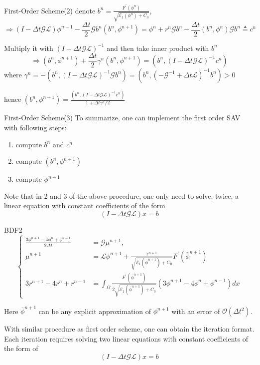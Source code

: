 \documentclass[9pt]{beamer}
\begin{document}
\begin{frame}{First-Order Scheme(2)}
denote $b^n = \frac{F^{\prime}(\phi^n)}{\sqrt{\mathcal{E}_{1}(\phi^{n})+C_0}}$,
$$\Rightarrow
(I-\Delta t \mathcal{G L}) \phi^{n+1}-\frac{\Delta t}{2} \mathcal{G}b^{n}\left(b^{n}, \phi^{n+1}\right)=\phi^{n}+r^{n} \mathcal{G} b^{n}-\frac{\Delta t}{2}\left(b^{n}, \phi^{n}\right) \mathcal{G} b^{n} \triangleq c^n$$

Multiply it with $(I-\Delta t \mathcal{G L})^{-1}$ and then take inner product with $b^n$
$$\Rightarrow
\left(b^{n}, \phi^{n+1}\right)+\frac{\Delta t}{2} \gamma^{n}\left(b^{n}, \phi^{n+1}\right)=\left(b^{n},(I-\Delta t \mathcal{G L})^{-1} c^{n}\right)$$
where $\gamma^{n}=-\left(b^{n},(I-\Delta t \mathcal{G} \mathcal{L})^{-1} \mathcal{G} b^{n}\right)=\left(b^{n},\left(-\mathcal{G}^{-1}+\Delta t \mathcal{L}\right)^{-1} b^{n}\right)>0$

hence
$\left(b^{n}, \phi^{n+1}\right)=\frac{\left(b^{n},(I-\Delta t \mathcal{G L})^{-1} c^{n}\right)}{1+\Delta t \gamma^{n} / 2}$
\end{frame}

\begin{frame}{First-Order Scheme(3)}
To summarize, one can implement the first order SAV with following steps:
\begin{enumerate}
\item{compute $b^n$ and $c^n$}
\item{compute $(b^n,\phi^{n+1})$}
\item{compute $\phi^{n+1}$}
\end{enumerate}
Note that in 2 and 3 of the above procedure, one only need to solve, twice, a linear equation with constant coefficients of the form
$$(I-\Delta t \mathcal{G L}) x = b$$
\end{frame}

\begin{frame}{BDF2}
$$\left\{
\begin{aligned}
 \frac{3 \phi^{n+1}-4 \phi^{n}+\phi^{n-1}}{2 \Delta t} &=\mathcal{G} \mu^{n+1}, \\ \mu^{n+1} &=\mathcal{L} \phi^{n+1}+\frac{r^{n+1}}{\sqrt{\mathcal{E}_{1}(\bar{\phi}^{n+1})+C_0}} F^{\prime}(\bar{\phi}^{n+1}) \\ 3 r^{n+1}-4 r^{n}+r^{n-1} &=\int_{\Omega} \frac{F^{\prime}(\bar{\phi}^{n+1})}{2 \sqrt{\mathcal{E}_{1}(\bar{\phi}^{n+1})+C_0}}\left(3 \phi^{n+1}-4 \phi^{n}+\phi^{n-1}\right) dx
 \end{aligned}
\right.$$

Here $\bar{\phi}^{n+1}$ can be any explicit approximation of $\phi^{n+1}$ with an error of $\mathcal O(\Delta t^2)$.

With similar procedure as first order scheme, one can obtain the iteration format. Each iteration requires solving two linear equations with constant coefficients of the form of $$(I-\Delta t \mathcal{G L}) x = b$$

\end{frame}
\end{document}
